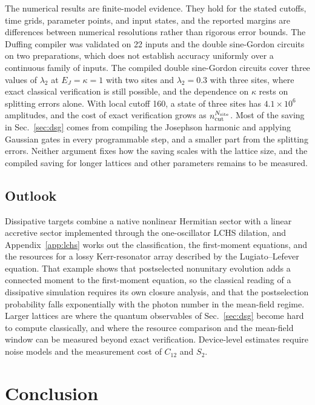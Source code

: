 \documentclass[pra,twocolumn,superscriptaddress,nofootinbib,floatfix]{revtex4-2}
\theoremstyle{remark}
\newcommand{\revcolor}{\color{blue}}
\DeclareRobustCommand{\rev}[1]{{\revcolor #1}}
\begin{document}
\rev{The numerical results are finite-model evidence.} \rev{They hold for the stated cutoffs, time grids, parameter points, and input states, and the reported margins are differences between numerical resolutions rather than rigorous error bounds.} \rev{The Duffing compiler was validated on 22 inputs and the double sine-Gordon circuits on two preparations, which does not establish accuracy uniformly over a continuous family of inputs.} \rev{The compiled double sine-Gordon circuits cover three values of \(\lambda_2\) at \(E_J=\kappa=1\) with two sites and \(\lambda_2=0.3\) with three sites, where exact classical verification is still possible, and the dependence on \(\kappa\) rests on splitting errors alone.} \rev{With local cutoff 160, a state of three sites has \(4.1\times10^6\) amplitudes, and the cost of exact verification grows as \(n_{\rm cut}^{N_{\rm site}}\).} \rev{Most of the saving in Sec.~\ref{sec:dsg} comes from compiling the Josephson harmonic and applying Gaussian gates in every programmable step, and a smaller part from the splitting errors.} \rev{Neither argument fixes how the saving scales with the lattice size, and the compiled saving for longer lattices and other parameters remains to be measured.}

\subsection{\rev{Outlook}}

\rev{Dissipative targets combine a native nonlinear Hermitian sector with a linear accretive sector implemented through the one-oscillator LCHS dilation, and Appendix~\ref{app:lchs} works out the classification, the first-moment equations, and the resources for a lossy Kerr-resonator array described by the Lugiato--Lefever equation.} \rev{That example shows that postselected nonunitary evolution adds a connected moment to the first-moment equation, so the classical reading of a dissipative simulation requires its own closure analysis, and that the postselection probability falls exponentially with the photon number in the mean-field regime.} \rev{Larger lattices are where the quantum observables of Sec.~\ref{sec:dsg} become hard to compute classically, and where the resource comparison and the mean-field window can be measured beyond exact verification.} \rev{Device-level estimates require noise models and the measurement cost of \(C_{12}\) and \(S_2\).}

\section{\rev{Conclusion}}
\label{sec:conclusion}
\end{document}
